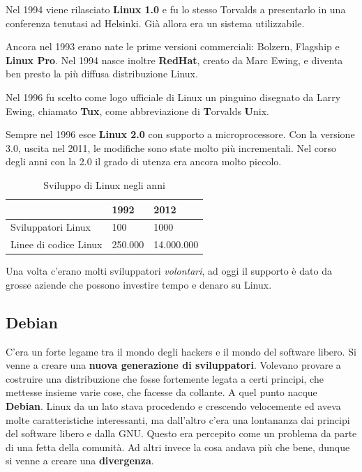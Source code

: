 Nel 1994 viene rilasciato \textbf{Linux 1.0} e fu lo stesso Torvalds a presentarlo in una conferenza tenutasi ad Helsinki. Già allora era un sistema utilizzabile.

Ancora nel 1993 erano nate le prime versioni commerciali: Bolzern, Flagship e \textbf{Linux Pro}. Nel 1994 nasce inoltre \textbf{RedHat}, creato da Marc Ewing, e diventa ben presto la più diffusa distribuzione Linux.

Nel 1996 fu scelto come logo ufficiale di Linux un pinguino disegnato da Larry Ewing, chiamato \textbf{Tux}, come abbreviazione di \textbf{T}orvalds \textbf{U}nix.

Sempre nel 1996 esce \textbf{Linux 2.0} con supporto a microprocessore. Con la versione 3.0, uscita nel 2011, le modifiche sono state molto più incrementali. Nel corso degli anni con la 2.0 il grado di utenza era ancora molto piccolo.

\begin{table}[htp]
	\centering
	\begin{tabular}[c]{l | l | l}
		\hline
		& 1992 & 2012 \\
		\hline
		Sviluppatori Linux & 100 & 1000 \\
		\hline
		Linee di codice Linux & 250.000 & 14.000.000 \\
		\hline
	\end{tabular}
	\caption{Sviluppo di Linux negli anni}
\end{table}

Una volta c'erano molti sviluppatori \textit{volontari}, ad oggi il supporto è dato da grosse aziende che possono investire tempo e denaro su Linux.

\subsection{Debian}

C'era un forte legame tra il mondo degli hackers e il mondo del software libero. Si venne a creare una \textbf{nuova generazione di sviluppatori}. Volevano provare a costruire una distribuzione che fosse fortemente legata a certi principi, che mettesse insieme varie cose, che facesse da collante. A quel punto nacque \textbf{Debian}. Linux da un lato stava procedendo e crescendo velocemente ed aveva molte caratteristiche interessanti, ma dall'altro c'era una lontananza dai principi del software libero e dalla GNU. Questo era percepito come un problema da parte di una fetta della comunità. Ad altri invece la cosa andava più che bene, dunque si venne a creare una \textbf{divergenza}. 

